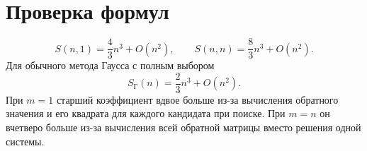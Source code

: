 \documentclass[a4paper,12pt]{article}
\begin{document}
\section{Проверка формул}
\[
    S(n,1) = \frac{4}{3}n^3 + O(n^2),
    \qquad S(n,n) = \frac{8}{3}n^3 + O(n^2).
\]
Для обычного метода Гаусса с полным выбором
\[
    S_{\text{Г}}(n) = \frac{2}{3}n^3 + O(n^2).
\]
При $m = 1$ старший коэффициент вдвое больше из-за вычисления обратного значения и его квадрата для каждого кандидата при поиске. При $m = n$ он вчетверо больше из-за вычисления всей обратной матрицы вместо решения одной системы.
\end{document}
